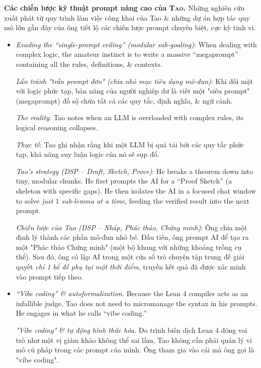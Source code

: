 \documentclass{article}
\begin{document}
\begin{enumerate}
	\textbf{Các chiến lược kỹ thuật prompt nâng cao của \textsc{Tao}.} Những nghiên cứu xuất phát từ quy trình làm việc công khai của {\sc Tao} \& những dự án hợp tác quy mô lớn gần đây của ông tiết lộ các chiến lược prompt chuyên biệt, cực kỳ tinh vi.
	\begin{itemize}
		\item[(i)] \textit{Evading the ``single-prompt ceiling'' (modular sub-goaling)}: When dealing with complex logic, the amateur instinct is to write a massive ``megaprompt'' containing all the rules, definitions, \& contexts.
		
		\textit{Lẩn tránh "trần prompt đơn" (chia nhỏ mục tiêu dạng mô-đun)}: Khi đối mặt với logic phức tạp, bản năng của người nghiệp dư là viết một "siêu prompt" (megaprompt) đồ sộ chứa tất cả các quy tắc, định nghĩa, \& ngữ cảnh.
		
		\textit{The reality}: {\sc Tao} notes when an LLM is overloaded with complex rules, its logical reasoning collapses.
		
		\textit{Thực tế}: {\sc Tao} ghi nhận rằng khi một LLM bị quá tải bởi các quy tắc phức tạp, khả năng suy luận logic của nó sẽ sụp đổ.
		
		\textit{Tao's strategy (DSP -- Draft, Sketch, Prove)}: He breaks a theorem down into tiny, modular chunks. He first prompts the AI for a ``Proof Sketch'' (a skeleton with specific gaps). He then isolates the AI in a focused chat window to solve \textit{just $1$ sub-lemma at a time}, feeding the verified result into the next prompt.
		
		\textit{Chiến lược của Tao (DSP -- Nháp, Phác thảo, Chứng minh)}: Ông chia một định lý thành các phần mô-đun nhỏ bé. Đầu tiên, ông prompt AI để tạo ra một "Phác thảo Chứng minh" (một bộ khung với những khoảng trống cụ thể). Sau đó, ông cô lập AI trong một cửa sổ trò chuyện tập trung để giải quyết \textit{chỉ 1 bổ đề phụ tại một thời điểm}, truyền kết quả đã được xác minh vào prompt tiếp theo.
		\item[(ii)] \textit{``Vibe coding'' \& autoformalization.} Because the Lean 4 compiler acts as an infallible judge, {\sc Tao} does not need to micromanage the syntax in his prompts. He engages in what he calls ``vibe coding.''
		
		\textit{"Vibe coding" \& tự động hình thức hóa.} Do trình biên dịch Lean 4 đóng vai trò như một vị giám khảo không thể sai lầm, {\sc Tao} không cần phải quản lý vi mô cú pháp trong các prompt của mình. Ông tham gia vào cái mà ông gọi là "vibe coding".
		

\end{itemize}
\end{enumerate}
\end{document}
